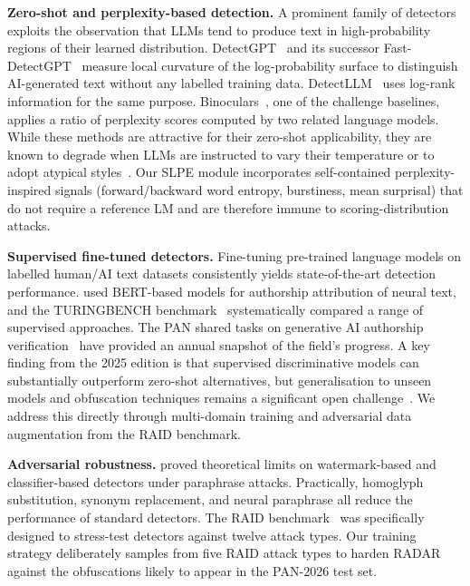 \documentclass[]{ceurart}
\begin{document}
\textbf{Zero-shot and perplexity-based detection.}
A prominent family of detectors exploits the observation that LLMs tend to produce text in high-probability regions of their learned distribution. DetectGPT~\cite{mitchell:2023} and its successor Fast-DetectGPT~\cite{bao:2023} measure local curvature of the log-probability surface to distinguish AI-generated text without any labelled training data. DetectLLM~\cite{su:2023} uses log-rank information for the same purpose. Binoculars~\cite{hans:2024}, one of the challenge baselines, applies a ratio of perplexity scores computed by two related language models. While these methods are attractive for their zero-shot applicability, they are known to degrade when LLMs are instructed to vary their temperature or to adopt atypical styles~\cite{sadasivan:2023}. Our SLPE module incorporates self-contained perplexity-inspired signals (forward/backward word entropy, burstiness, mean surprisal) that do not require a reference LM and are therefore immune to scoring-distribution attacks.

\textbf{Supervised fine-tuned detectors.}
Fine-tuning pre-trained language models on labelled human/AI text datasets consistently yields state-of-the-art detection performance. \citet{uchendu:2020} used BERT-based models for authorship attribution of neural text, and the TURINGBENCH benchmark~\cite{uchendu:2021} systematically compared a range of supervised approaches. The PAN shared tasks on generative AI authorship verification~\cite{bevendorff:2024,bevendorff:2025} have provided an annual snapshot of the field's progress. A key finding from the 2025 edition is that supervised discriminative models can substantially outperform zero-shot alternatives, but generalisation to unseen models and obfuscation techniques remains a significant open challenge~\cite{bevendorff:2025b}. We address this directly through multi-domain training and adversarial data augmentation from the RAID benchmark.

\textbf{Adversarial robustness.}
\citet{sadasivan:2023} proved theoretical limits on watermark-based and classifier-based detectors under paraphrase attacks. Practically, homoglyph substitution, synonym replacement, and neural paraphrase all reduce the performance of standard detectors. The RAID benchmark~\cite{dugan:2024} was specifically designed to stress-test detectors against twelve attack types. Our training strategy deliberately samples from five RAID attack types to harden RADAR against the obfuscations likely to appear in the PAN-2026 test set.
\end{document}
